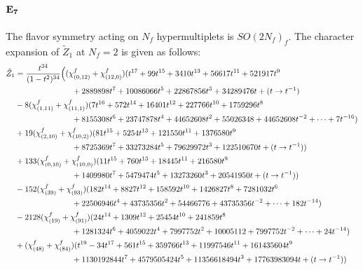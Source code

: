 \documentclass[letterpaper, 11pt]{article}
\newcommand{\nn}{\nonumber}
\begin{document}
{\paragraph{$\bf E_7$} The flavor symmetry acting on $N_f$ hypermultiplets is $SO(2N_f)_f$. The character expansion of $\tilde{Z}_1$ at $N_f=2$ is given as follows:
  \begin{align}
    \label{eq:E7F2}
    \tilde{Z}_1&=\frac{t^{34}}{(1-t^2)^{34}}\Big((\chi^f_{(0,12)}+\chi^f_{(12,0)})(t^{17}+99 t^{15}+3410 t^{13}+56617 t^{11}+521917 t^9\\
    &\hspace{2.5cm}+2889898 t^7+10086066 t^5+22867856t^3+34289476t+(t\rightarrow t^{-1})\nn\\
    &-8(\chi^f_{(1,11)}+\chi^f_{(11,1)})(7 t^{16}+572 t^{14}+16401 t^{12}+227766 t^{10}+1759296 t^8\nn\\
    &\hspace{2.5cm}+8155308 t^6+23747878 t^4+44652608t^2+55026348+44652608t^{-2}+\cdots+7t^{-16})\nn\\
    &+19(\chi^f_{(2,10)}+\chi^f_{(10,2)})(81 t^{15}+5254 t^{13}+121550 t^{11}+1376580 t^9\nn\\
    &\hspace{2.5cm}+8725369 t^7+33273284 t^5+79629972t^3+122510670t+(t\rightarrow t^{-1}))\nn\\
    &+133(\chi^f_{(0,10)}+\chi^f_{(10,0)})(11 t^{15}+760 t^{13}+18445 t^{11}+216580 t^9\nn\\
    &\hspace{2.5cm}+1409980 t^7+5479474 t^5+13273260t^3+20541950t+(t\rightarrow t^{-1}))\nn\\
    &-152(\chi^f_{(39)}+\chi^f_{(93)})(182 t^{14}+8827 t^{12}+158592 t^{10}+1426827 t^8+7281032 t^6\nn\\
    &\hspace{2.5cm}+22506946 t^4+43735356t^2+54466776+43735356t^{-2}+\cdots+182t^{-14})\nn\\
    &-2128(\chi^f_{(19)}+\chi^f_{(91)})(24 t^{14}+1309 t^{12}+25454 t^{10}+241859 t^8\nn\\
    &\hspace{2.5cm}+1281324 t^6+4059022 t^4+7997752t^2+10005112+7997752t^{-2}+\cdots+24t^{-14})\nn\\
    &+(\chi^f_{(48)}+\chi^f_{(84)})(t^{19}-34 t^{17}+561 t^{15}+359766 t^{13}+11997546 t^{11}+161435604 t^9\nn\\
    &\hspace{2.5cm}+1130192844t^7+4579505424 t^5+11356618494t^3+17763983094t+(t\rightarrow t^{-1}))\nn\\

\end{align}}
\end{document}
